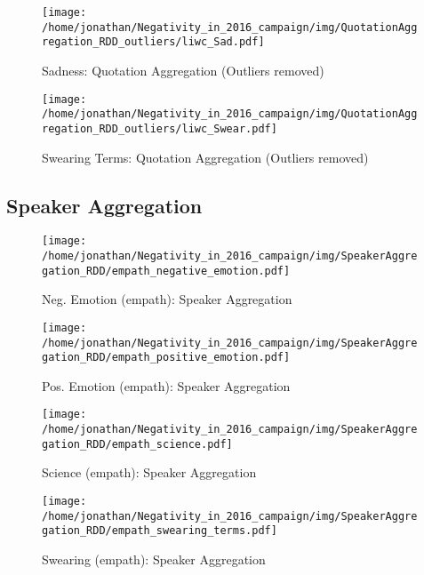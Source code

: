 \begin{figure}[h]\centering
	\texttt{[image: /home/jonathan/Negativity\_in\_2016\_campaign/img/QuotationAggregation\_RDD\_outliers/liwc\_Sad.pdf]}
	\caption{Sadness: Quotation Aggregation (Outliers removed)}
	\label{fig: qa_Sadness}
\end{figure}

\begin{figure}[h]\centering
	\texttt{[image: /home/jonathan/Negativity\_in\_2016\_campaign/img/QuotationAggregation\_RDD\_outliers/liwc\_Swear.pdf]}
	\caption{Swearing Terms: Quotation Aggregation (Outliers removed)}
	\label{fig: qa_Swearing Terms}
\end{figure}

\clearpage
\pagebreak

\subsection{Speaker Aggregation}

\begin{figure}[h]\centering
	\texttt{[image: /home/jonathan/Negativity\_in\_2016\_campaign/img/SpeakerAggregation\_RDD/empath\_negative\_emotion.pdf]}
	\caption{Neg. Emotion (empath): Speaker Aggregation}
	\label{fig: sa_Neg. Emotion (empath)}
\end{figure}

\begin{figure}[h]\centering
	\texttt{[image: /home/jonathan/Negativity\_in\_2016\_campaign/img/SpeakerAggregation\_RDD/empath\_positive\_emotion.pdf]}
	\caption{Pos. Emotion (empath): Speaker Aggregation}
	\label{fig: sa_Pos. Emotion (empath)}
\end{figure}

\begin{figure}[h]\centering
	\texttt{[image: /home/jonathan/Negativity\_in\_2016\_campaign/img/SpeakerAggregation\_RDD/empath\_science.pdf]}
	\caption{Science (empath): Speaker Aggregation}
	\label{fig: sa_Science (empath)}
\end{figure}

\begin{figure}[h]\centering
	\texttt{[image: /home/jonathan/Negativity\_in\_2016\_campaign/img/SpeakerAggregation\_RDD/empath\_swearing\_terms.pdf]}
	\caption{Swearing (empath): Speaker Aggregation}
	\label{fig: sa_Swearing (empath)}
\end{figure}

